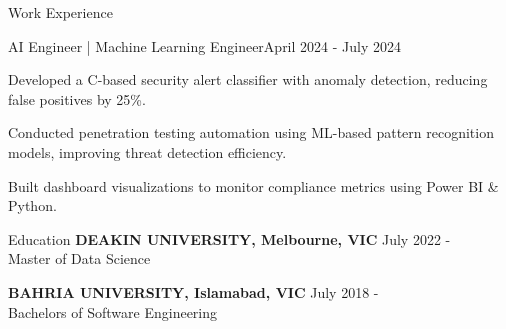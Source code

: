 \documentclass{resume} %
\begin{document}
    \begin{rSection}{Work Experience}
                    \begin{rSubsection}
                {AI Engineer | Machine Learning Engineer}{April 2024 - July 2024}
                                    {}
                                {}
                                    \item Developed a C{-}based security alert classifier with anomaly detection, reducing false positives by 25\%.
                                    \item Conducted penetration testing automation using ML{-}based pattern recognition models, improving threat detection efficiency.
                                    \item Built dashboard visualizations to monitor compliance metrics using Power BI \& Python.
                            \end{rSubsection}
            \end{rSection}

\begin{rSection}{Education}
                        \textbf{DEAKIN UNIVERSITY, Melbourne, VIC} \hfill {July 2022 - } \\
                            {Master of Data Science}
                         
             
         
                        \textbf{BAHRIA UNIVERSITY, Islamabad, VIC} \hfill {July 2018 - } \\
                            {Bachelors of Software Engineering}
                         
             
         
    \end{rSection}
\end{document}
